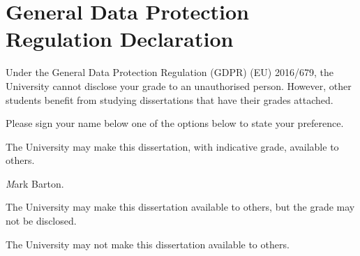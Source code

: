 
\section*{General Data Protection Regulation Declaration}
\vspace{0.5cm}
\begin{flushleft}
Under the General Data Protection Regulation (GDPR) (EU) 2016/679, the University cannot disclose your grade to an unauthorised person. However, other students benefit from studying dissertations that have their grades attached. \newline

\vspace{0.5cm}

Please sign your name below one of the options below to state your preference.\newline
\vspace{0.5cm}

The University may make this dissertation, with indicative grade, available to others.\newline
\vspace{0.5cm}

\emph Mark Barton. \newline
\vspace{2cm}


The University may make this dissertation available to others, but the grade may not be disclosed.\newline
\vspace{3cm}


The University may not make this dissertation available to others.\newline
\end{flushleft}


